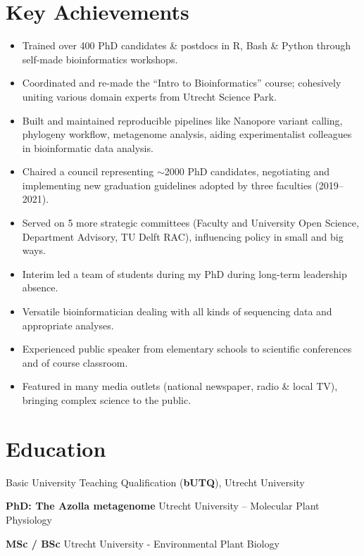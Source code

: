\documentclass[a4paper,10pt]{article}
\begin{document}
{\begin{adjustbox}{valign=t}
\begin{minipage}[t]{0.6\textwidth}
\section*{Key Achievements}
\begin{itemize}
    \setlength{\itemindent}{0em}
    \setlength{\parindent}{5em}
  \item Trained over 400 PhD candidates \& postdocs in R, Bash \& Python through self-made bioinformatics workshops.
  \item Coordinated and re-made the “Intro to Bioinformatics” course; cohesively uniting various domain experts from Utrecht Science Park.
  \item Built and maintained reproducible pipelines like Nanopore variant calling, phylogeny workflow, metagenome analysis, aiding experimentalist colleagues in bioinformatic data analysis.
  \item Chaired a council representing $\sim$2000 PhD candidates, negotiating and implementing new graduation guidelines adopted by three faculties (2019--2021).
  \item Served on 5 more strategic committees (Faculty and University Open Science, Department Advisory, TU Delft RAC), influencing policy in small and big ways.
  \item Interim led a team of students during my PhD during long-term leadership absence.
  \item Versatile bioinformatician dealing with all kinds of sequencing data and appropriate analyses.
  \item Experienced public speaker from elementary schools to scientific conferences and of course classroom.
  \item Featured in many media outlets (national newspaper, radio \& local TV), bringing complex science to the public.
\end{itemize}


\end{minipage}%
\end{adjustbox}%
}
\newpage

\section*{Education}
\begin{description}
\raggedright
\item[\normalfont \textcolor{ForestGreen}{\textbf{2022.}}] Basic University Teaching Qualification (\textbf{bUTQ}), Utrecht University
\item[\normalfont \textcolor{ForestGreen}{\textbf{2017 -- 2022.}}] \textbf{PhD: The Azolla metagenome} Utrecht University – Molecular Plant Physiology
\item[\normalfont \textcolor{ForestGreen}{\textbf{2010 -- 2017.}}] \textbf{MSc / BSc} Utrecht University - Environmental Plant Biology
\end{description}
\end{document}
